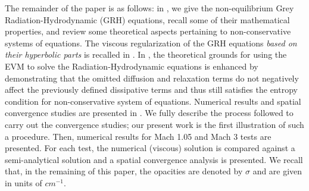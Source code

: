 \documentclass[times,doublespace]{fldauth}%
\begin{document}
The remainder of the paper is as follows: in , we give
the non-equilibrium Grey Radiation-Hydrodynamic (GRH) equations, recall some of their mathematical properties, 
and review some theoretical aspects pertaining to non-conservative systems of equations. 
The viscous regularization of the GRH equations {\it based on their hyperbolic parts} is recalled in .
In , the theoretical grounds for using the EVM to solve the 
Radiation-Hydrodynamic equations is enhanced by demonstrating that the omitted diffusion
and relaxation terms do not negatively affect the previously defined dissipative terms and thus still satisfies the 
entropy condition for non-conservative system of equations. 
Numerical results and spatial convergence studies are presented in . We fully describe the process followed 
to carry out the convergence studies; our present work is the first illustration of such a procedure. Then, numerical results for 
Mach 1.05 and Mach 3 tests are presented.
For each test, the numerical (viscous) solution is compared against a semi-analytical solution and a spatial convergence analysis is presented. 
We recall that, in the remaining of this paper, the opacities are denoted by $\sigma$ and are given in  units of $cm^{-1}$. 
%
\end{document}
